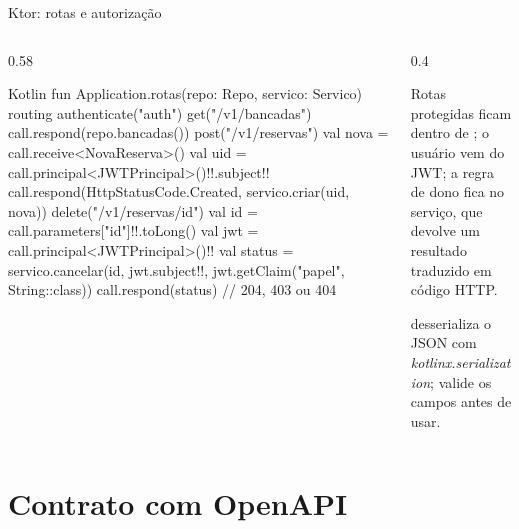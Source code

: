 \documentclass[aspectratio=169,10pt]{beamer}
\begin{document}
\begin{frame}[fragile]{Ktor: rotas e autorização}
  \begin{columns}[T]
    \begin{column}{0.58\textwidth}
\begin{codigo}[title=Rotas.kt]{Kotlin}
fun Application.rotas(repo: Repo, servico: Servico) {
  routing {
    authenticate("auth") {
      get("/v1/bancadas") { call.respond(repo.bancadas()) }
      post("/v1/reservas") {
        val nova = call.receive<NovaReserva>()
        val uid = call.principal<JWTPrincipal>()!!.subject!!
        call.respond(HttpStatusCode.Created,
          servico.criar(uid, nova))
      }
      delete("/v1/reservas/{id}") {
        val id = call.parameters["id"]!!.toLong()
        val jwt = call.principal<JWTPrincipal>()!!
        val status = servico.cancelar(id, jwt.subject!!,
          jwt.getClaim("papel", String::class))
        call.respond(status)     // 204, 403 ou 404
      }
    }
  }
}
\end{codigo}
    \end{column}
    \begin{column}{0.4\textwidth}
      \begin{conceito}
        Rotas protegidas ficam dentro de ; o usuário vem do JWT; a regra de dono fica no serviço, que devolve um resultado traduzido em código HTTP.
      \end{conceito}
      \begin{dica}
         desserializa o JSON com \emph{kotlinx.serialization}; valide os campos antes de usar.
      \end{dica}
    \end{column}
  \end{columns}
\end{frame}

\section{Contrato com OpenAPI}
\end{document}
